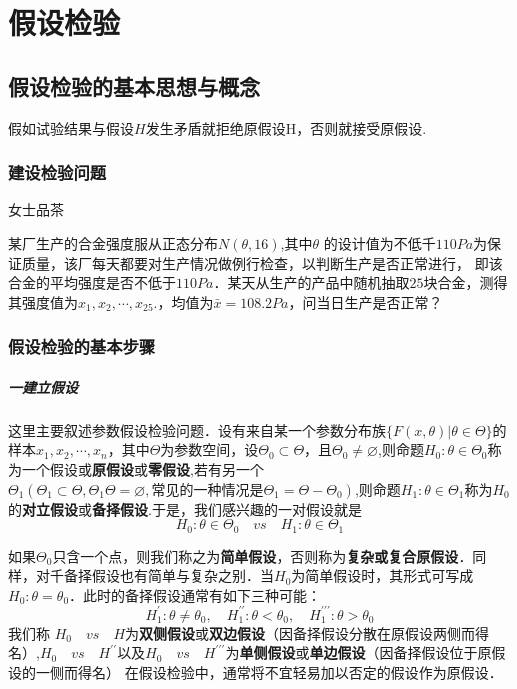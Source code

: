 \chapter{假设检验}
\section{假设检验的基本思想与概念}
假如试验结果与假设$H$发生矛盾就拒绝原假设H，否则就接受原假设.
\subsection{建设检验问题}
\begin{example}
    女士品茶
\end{example}
\begin{example}
    某厂生产的合金强度服从正态分布$N(\theta,16)$,其中$\theta$ 的设计值为不低千$110 Pa$为保证质量，该厂每天都要对生产情况做例行检查，以判断生产是否正常进行，
    即该合金的平均强度是否不低于$110 Pa$．某天从生产的产品中随机抽取$25$块合金，测得其强度值为$x_{1},x_{2},\cdots,x_{25}.$，均值为$\bar{x}=108.2 Pa$，问当日生产是否正常？
\end{example}


\subsection{假设检验的基本步骤}

\paragraph{一\quad 建立假设} 这里主要叙述参数假设检验问题．设有来自某一个参数分布族$\{F(x,\theta)|\theta \in \Theta\}$的样本$x_1 , x_2 , \cdots,x_n$，其中$\Theta$为参数空间，设$\Theta_0 \subset \Theta$，且$\Theta_0 \neq \varnothing$,则命题$H_0:\theta \in \Theta_0$称为一个假设或\textbf{原假设}或\textbf{零假设},若有另一个$\Theta_1(\Theta_1 \subset \Theta,\Theta_1 \Theta = \varnothing,\text{常见的一种情况是}\Theta_1=\Theta-\Theta_0)$,则命题$H_1:\theta \in \Theta_1$称为$H_0$的\textbf{对立假设}或\textbf{备择假设}.于是，我们感兴趣的一对假设就是
\begin{equation}
    H_0:\theta \in \Theta_0 \quad vs \quad H_1:\theta \in \Theta_1
\end{equation}

如果$\Theta_0$只含一个点，则我们称之为\textbf{简单假设}，否则称为\textbf{复杂或复合原假设}．同样，对千备择假设也有简单与复杂之别．当$H_0$为简单假设时，其形式可写成$H_0:\theta=\theta_0$．此时的备择假设通常有如下三种可能：
$$
    H_1^{\prime}:\theta\neq\theta_0,\quad H_1^{\prime\prime}:\theta<\theta_0,\quad H_1^{\prime\prime\prime}:\theta>\theta_0
$$
我们称 $H_{0} \quad vs \quad H$为\textbf{双侧假设}或\textbf{双边假设}（因备择假设分散在原假设两侧而得名）,$H_{0} \quad vs \quad H^{\prime\prime}$以及$H_0 \quad vs \quad  H^{\prime\prime\prime}$为\textbf{单侧假设}或\textbf{单边假设}（因备择假设位于原假设的一侧而得名）
在假设检验中，通常将不宜轻易加以否定的假设作为原假设．
